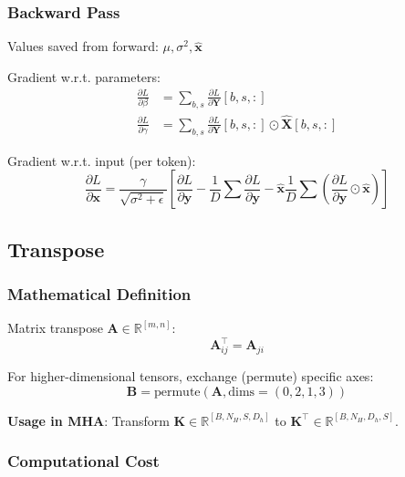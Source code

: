 \documentclass[10pt]{article}
\begin{document}
\subsubsection{Backward Pass}

Values saved from forward: $\mu, \sigma^2, \hat{\mathbf{x}}$

Gradient w.r.t. parameters:
\begin{align}
\frac{\partial L}{\partial \beta} &= \sum_{b,s} \frac{\partial L}{\partial \mathbf{Y}}[b,s,:] \\
\frac{\partial L}{\partial \gamma} &= \sum_{b,s} \frac{\partial L}{\partial \mathbf{Y}}[b,s,:] \odot \hat{\mathbf{X}}[b,s,:]
\end{align}

Gradient w.r.t. input (per token):
\begin{equation}
\frac{\partial L}{\partial \mathbf{x}} = \frac{\gamma}{\sqrt{\sigma^2 + \epsilon}} \left[ \frac{\partial L}{\partial \mathbf{y}} - \frac{1}{D}\sum \frac{\partial L}{\partial \mathbf{y}} - \hat{\mathbf{x}} \frac{1}{D}\sum \left(\frac{\partial L}{\partial \mathbf{y}} \odot \hat{\mathbf{x}}\right) \right]
\end{equation}

\subsection{Transpose}
\label{subsec:transpose}

\subsubsection{Mathematical Definition}

Matrix transpose $\mathbf{A} \in \mathbb{R}^{[m,n]}$:
\begin{equation}
\mathbf{A}^{\top}_{ij} = \mathbf{A}_{ji}
\end{equation}

For higher-dimensional tensors, exchange (permute) specific axes:
\begin{equation}
\mathbf{B} = \text{permute}(\mathbf{A}, \text{dims}=(0,2,1,3))
\end{equation}

\textbf{Usage in MHA}: Transform $\mathbf{K} \in \mathbb{R}^{[B,N_H,S,D_h]}$ to $\mathbf{K}^{\top} \in \mathbb{R}^{[B,N_H,D_h,S]}$.

\subsubsection{Computational Cost}
\end{document}
